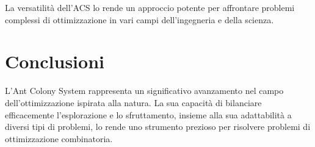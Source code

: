La versatilità dell'\gls{ACS} lo rende un approccio potente per affrontare problemi complessi di ottimizzazione in vari campi dell'ingegneria e della scienza.

\section{Conclusioni}

L'Ant Colony System rappresenta un significativo avanzamento nel campo dell'ottimizzazione ispirata alla natura. La sua capacità di bilanciare efficacemente l'esplorazione e lo sfruttamento, insieme alla sua adattabilità a diversi tipi di problemi, lo rende uno strumento prezioso per risolvere problemi di ottimizzazione combinatoria. \cite{Dorigo1997}


